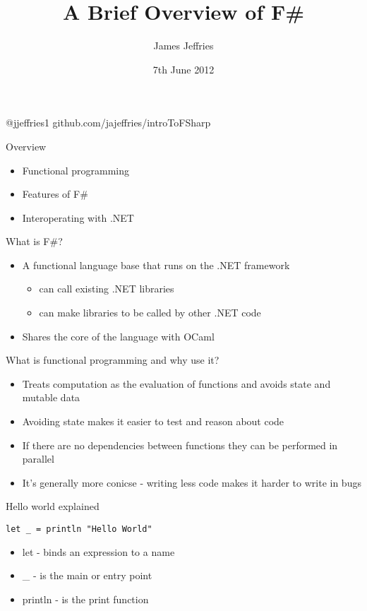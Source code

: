 \documentclass[landscape]{slides}
\author{James Jeffries}
\title{A Brief Overview of F\#}
\date{7th June 2012}
\begin{document}
\begin{slide}
\maketitle
@jjeffries1
github.com/jajeffries/introToFSharp
\end{slide}

\begin{slide}{Overview}
\begin{itemize}
\item Functional programming 
\item Features of F\#
\item Interoperating with .NET
\end{itemize}
\end{slide}

\begin{slide}{What is F\#?}
\begin{itemize}
\item A functional language base that runs on the .NET framework
\begin{itemize}
\item can call existing .NET libraries
\item can make libraries to be called by other .NET code
\end{itemize}
\item Shares the core of the language with OCaml
\end{itemize}
\end{slide}

\begin{slide}{What is functional programming and why use it?}
\begin{itemize}
\item Treats computation as the evaluation of functions and avoids state and mutable data
\item Avoiding state makes it easier to test and reason about code
\item If there are no dependencies between functions they can be performed in parallel
\item It's generally more conicse - writing less code makes it harder to write in bugs
\end{itemize}
\end{slide}

\begin{slide}{Hello world explained}
\begin{verbatim}
let _ = println "Hello World"
\end{verbatim}
\begin{itemize}
\item let - binds an expression to a name
\item \_ - is the main or entry point
\item println - is the print function
\end{itemize}
\end{slide}

\end{document}
